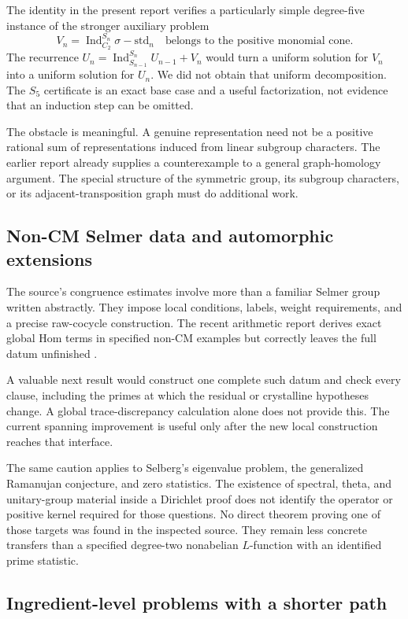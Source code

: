 The identity in the present report verifies a particularly simple
degree-five instance of the stronger auxiliary problem
\[
 V_n=\operatorname{Ind}_{C_2}^{S_n}\sigma-\mathrm{std}_n
 \quad\text{belongs to the positive monomial cone}.
\]
The recurrence $U_n=\operatorname{Ind}_{S_{n-1}}^{S_n}U_{n-1}+V_n$
would turn a uniform solution for $V_n$ into a uniform solution for $U_n$.
We did not obtain that uniform decomposition. The $S_5$ certificate is
an exact base case and a useful factorization, not evidence that an
induction step can be omitted.

The obstacle is meaningful. A genuine representation need not be a
positive rational sum of representations induced from linear subgroup
characters. The earlier report already supplies a counterexample to a
general graph-homology argument. The special structure of the symmetric
group, its subgroup characters, or its adjacent-transposition graph must
do additional work.

\subsection{Non-CM Selmer data and automorphic extensions}

The source's congruence estimates involve more than a familiar Selmer
group written abstractly. They impose local conditions, labels, weight
requirements, and a precise raw-cocycle construction. The recent
arithmetic report derives exact global Hom terms in specified non-CM
examples but correctly leaves the full datum unfinished
\cite{priorarithmetic}.

A valuable next result would construct one complete such datum and
check every clause, including the primes at which the residual or
crystalline hypotheses change. A global trace-discrepancy calculation
alone does not provide this. The current spanning improvement is useful
only after the new local construction reaches that interface.

The same caution applies to Selberg's eigenvalue problem, the generalized
Ramanujan conjecture, and zero statistics. The existence of spectral,
theta, and unitary-group material inside a Dirichlet proof does not
identify the operator or positive kernel required for those questions.
No direct theorem proving one of those targets was found in the inspected
source. They remain less concrete transfers than a specified degree-two
nonabelian $L$-function with an identified prime statistic.

\subsection{Ingredient-level problems with a shorter path}

